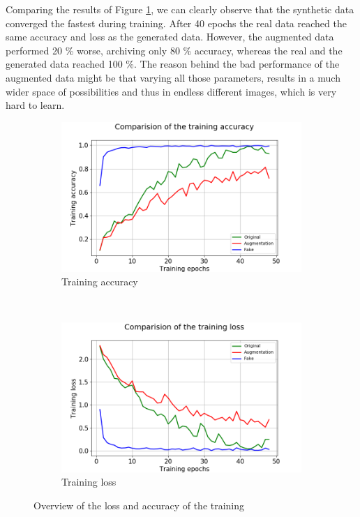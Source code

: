 \documentclass[13pt]{article}
\begin{document}
Comparing the results of Figure \ref{fruits_training}, we can clearly observe that the synthetic data converged the fastest during training. After 40 epochs the real data reached the same accuracy and loss as the generated data. However, the augmented data performed 20 \% worse, archiving only 80 \% accuracy, whereas the real and the generated data reached 100 \%. The reason behind the bad performance of the augmented data might be that varying all those parameters, results in a much wider space of possibilities and thus in endless different images, which is very hard to learn.

\begin{figure}[h!]
    \centering
    \begin{subfigure}[b]{0.48\textwidth}
        \includegraphics[width=\textwidth]{plots/fruits/comparision_acc.png}
        \caption{Training accuracy}
    \end{subfigure}
    ~ 
    \begin{subfigure}[b]{0.48\textwidth}
        \includegraphics[width=\textwidth]{plots/fruits/comparision_loss.png}
        \caption{Training loss}
    \end{subfigure}
    \caption{Overview of the loss and accuracy of the training}
    \label{fruits_training}
\end{figure}
\end{document}
